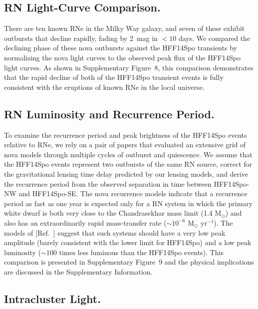 \documentclass{article}
\newcommand{\citeref}[1]{[Ref.~{\citenum{#1}}]}
\providecommand\citep{\cite}
\def\Msun{\mbox{M$_{\odot}$}\xspace}
\def\spock{HFF14Spo\xspace}
\def\spockone{HFF14Spo-NW\xspace}
\def\spocktwo{HFF14Spo-SE\xspace}
\begin{document}
\subsection{RN Light-Curve Comparison.}\label{sec:RNLightCurves}

There are ten known RNe in the Milky Way galaxy, and seven of these
exhibit outbursts that decline rapidly, fading by 2~mag in $<10$
days\citep{Schaefer:2010}.  We compared the declining phase of these
nova outbursts against the \spock transients by normalizing the nova
light curves to the observed peak flux of the \spock light curves. As
shown in Supplementary Figure~8, this comparison demonstrates that the
rapid decline of both of the \spock transient events is fully
consistent with the eruptions of known RNe in the local universe.

\subsection{RN Luminosity and Recurrence Period.}
\label{sec:RNLuminosityRecurrence}

To examine the recurrence period and peak brightness of the \spock
events relative to RNe, we rely on a pair of papers that evaluated an
extensive grid of nova models through multiple cycles of outburst and
quiescence\citep{Prialnik:1995,Yaron:2005}.  We assume that the \spock
events represent two outbursts of the same RN source, correct for the
gravitational lensing time delay predicted by our lensing models, and
derive the recurrence period from the observed separation in time
between \spockone and \spocktwo. The nova recurrence models indicate
that a recurrence period as fast as one year is expected only for a RN
system in which the primary white dwarf is both very close to the
Chandrasekhar mass limit (1.4 \Msun) and also has an extraordinarily
rapid mass-transfer rate ($\sim10^{-6}$ \Msun yr$^{-1}$).  The models
of \citeref{Yaron:2005} suggest that such systems should have a very
low peak amplitude (barely consistent with the lower limit for \spock)
and a low peak luminosity ($\sim100$ times less luminous than the
\spock events).  This comparison is presented in Supplementary
Figure~9 and the physical implications are discussed in the
Supplementary Information.


\subsection{Intracluster Light.}\label{sec:ICL}
\end{document}
